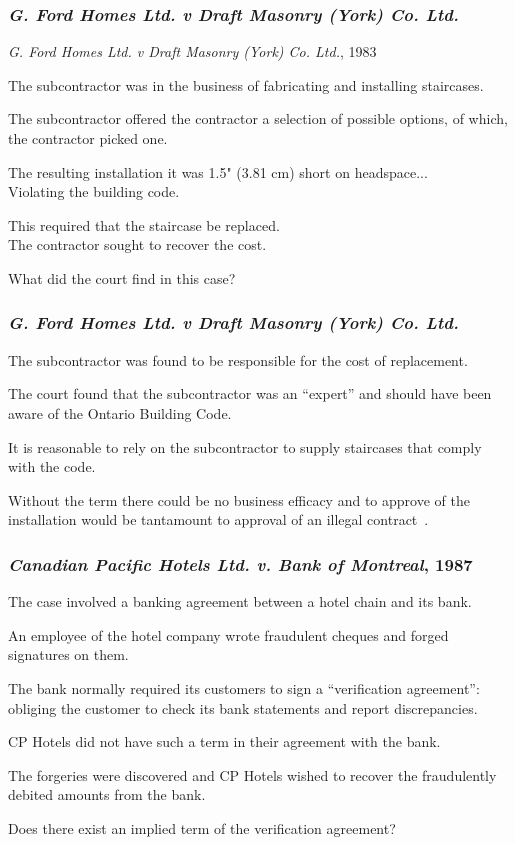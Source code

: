 \begin{frame}
\frametitle{\textit{G. Ford Homes Ltd. v Draft Masonry (York) Co. Ltd.}}

\textit{G. Ford Homes Ltd. v Draft Masonry (York) Co. Ltd.}, 1983 

The subcontractor was in the business of fabricating and installing staircases.

The subcontractor offered the contractor a selection of possible options, of which, the contractor picked one.

The resulting installation it was 1.5" (3.81 cm) short on headspace...\\
\quad Violating the building code.

This required that the staircase be replaced.\\
\quad The contractor sought to recover the cost.

What did the court find in this case?

\end{frame}



\begin{frame}
\frametitle{\textit{G. Ford Homes Ltd. v Draft Masonry (York) Co. Ltd.}}

The subcontractor was found to be responsible for the cost of replacement.

The court found that the subcontractor was an ``expert'' and should have been aware of the Ontario Building Code.

It is reasonable to rely on the subcontractor to supply staircases that comply with the code.

Without the term there could be no business efficacy and to approve of the installation  would be tantamount to approval of an illegal contract~\cite{lpe}.

\end{frame}



\begin{frame}
\frametitle{\textit{Canadian Pacific Hotels Ltd. v. Bank of Montreal}, 1987}

The case involved a banking agreement between a hotel chain and its bank.

An employee of the hotel company wrote fraudulent cheques and forged signatures on them.

The bank normally required its customers to sign a ``verification agreement'': obliging the customer to check its bank statements and report discrepancies.

CP Hotels did not have such a term in their agreement with the bank.

The forgeries were discovered and CP Hotels wished to recover the fraudulently debited amounts from the bank.

Does there exist an implied term of the verification agreement?

\end{frame}


